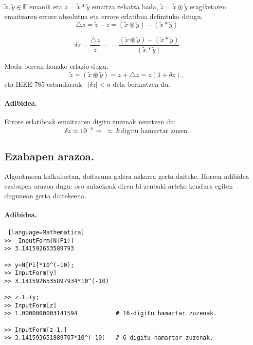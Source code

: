 $\tilde x,\tilde y \in \mathbb{F}$ emanik eta $z= \tilde x \ast \tilde y$ emaitza zehatza bada, $\tilde z= \tilde x \circledast \tilde y$ eragiketaren emaitzaren errore absolutua eta errore erlatiboa definituko ditugu,
\begin{equation*}
\triangle z=\tilde z-z =(\tilde x \circledast \tilde y) -(\tilde x \ast \tilde y)
\end{equation*} 

\begin{equation*}
\delta z=\frac{\triangle z}{z}==\frac{(\tilde x \circledast \tilde y) -(\tilde x \ast \tilde y)}{(\tilde x \ast \tilde y)}
\end{equation*} 

Modu berean honako erlazio dugu,
\begin{equation*}
\tilde z=(\tilde x \circledast \tilde y)=z+\triangle z=z(1+\delta z),  
\end{equation*}
eta IEEE-785 estandarrak \ $|\delta z|<u$ dela bermatzen du.


\paragraph*{\textbf{Adibidea.}}

Errore erlatiboak emaitzaren digitu zuzenak neurtzen du:
\begin{equation*}
\delta z \approx 10^{-k} \Rightarrow \ \approx \ k \ \mbox{digitu hamartar zuzen}.
\end{equation*}  

\subsection*{Ezabapen arazoa.}

Algoritmoen kalkuluetan, doitasuna galera azkarra gerta daiteke. Horren adibidea ezabapen arazoa dugu: oso antzekoak diren bi zenbaki arteko kendura egiten dugunean gerta daitekeena. 

\paragraph*{\textbf{Adibidea}.}

\begin{lstlisting} [language=Mathematica]
>>  InputForm[N[Pi]]
>> 3.141592653589793

>> y=N[Pi]*10^(-10);
>> InputForm[y]
>> 3.1415926535897934*10^(-10)

>> z=1.+y;
>> InputForm[z]
>> 1.0000000003141594           # 16-digitu hamartar zuzenak.

>> InputForm[z-1.]
>> 3.141593651889707*10^(-10)   # 6-digitu hamartar zuzenak.

\end{lstlisting}
 

